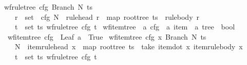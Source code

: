 \begin{isabellebody}
{\isacharbar}{\kern0pt}\ {\isachardoublequoteopen}wf{\isacharunderscore}{\kern0pt}rule{\isacharunderscore}{\kern0pt}tree\ cfg\ {\isacharparenleft}{\kern0pt}Branch\ N\ ts{\isacharparenright}{\kern0pt}\ {\isasymlongleftrightarrow}\ {\isacharparenleft}{\kern0pt}\isanewline
\ \ \ \ {\isacharparenleft}{\kern0pt}{\isasymexists}r\ {\isasymin}\ set\ {\isacharparenleft}{\kern0pt}{\isasymRR}\ cfg{\isacharparenright}{\kern0pt}{\isachardot}{\kern0pt}\ N\ {\isacharequal}{\kern0pt}\ rule{\isacharunderscore}{\kern0pt}head\ r\ {\isasymand}\ map\ root{\isacharunderscore}{\kern0pt}tree\ ts\ {\isacharequal}{\kern0pt}\ rule{\isacharunderscore}{\kern0pt}body\ r{\isacharparenright}{\kern0pt}\ {\isasymand}\isanewline
\ \ \ \ {\isacharparenleft}{\kern0pt}{\isasymforall}t\ {\isasymin}\ set\ ts{\isachardot}{\kern0pt}\ wf{\isacharunderscore}{\kern0pt}rule{\isacharunderscore}{\kern0pt}tree\ cfg\ t{\isacharparenright}{\kern0pt}{\isacharparenright}{\kern0pt}{\isachardoublequoteclose}\isanewline
\isanewline
{}\isamarkupfalse%
\ wf{\isacharunderscore}{\kern0pt}item{\isacharunderscore}{\kern0pt}tree\ {\isacharcolon}{\kern0pt}{\isacharcolon}{\kern0pt}\ {\isachardoublequoteopen}{\isacharprime}{\kern0pt}a\ cfg\ {\isasymRightarrow}\ {\isacharprime}{\kern0pt}a\ item\ {\isasymRightarrow}\ {\isacharprime}{\kern0pt}a\ tree\ {\isasymRightarrow}\ bool{\isachardoublequoteclose}\ \isanewline
\ \ {\isachardoublequoteopen}wf{\isacharunderscore}{\kern0pt}item{\isacharunderscore}{\kern0pt}tree\ cfg\ {\isacharunderscore}{\kern0pt}\ {\isacharparenleft}{\kern0pt}Leaf\ a{\isacharparenright}{\kern0pt}\ {\isasymlongleftrightarrow}\ True{\isachardoublequoteclose}\isanewline
{\isacharbar}{\kern0pt}\ {\isachardoublequoteopen}wf{\isacharunderscore}{\kern0pt}item{\isacharunderscore}{\kern0pt}tree\ cfg\ x\ {\isacharparenleft}{\kern0pt}Branch\ N\ ts{\isacharparenright}{\kern0pt}\ {\isasymlongleftrightarrow}\ {\isacharparenleft}{\kern0pt}\isanewline
\ \ \ \ N\ {\isacharequal}{\kern0pt}\ item{\isacharunderscore}{\kern0pt}rule{\isacharunderscore}{\kern0pt}head\ x\ {\isasymand}\ map\ root{\isacharunderscore}{\kern0pt}tree\ ts\ {\isacharequal}{\kern0pt}\ take\ {\isacharparenleft}{\kern0pt}item{\isacharunderscore}{\kern0pt}dot\ x{\isacharparenright}{\kern0pt}\ {\isacharparenleft}{\kern0pt}item{\isacharunderscore}{\kern0pt}rule{\isacharunderscore}{\kern0pt}body\ x{\isacharparenright}{\kern0pt}\ {\isasymand}\isanewline
\ \ \ \ {\isacharparenleft}{\kern0pt}{\isasymforall}t\ {\isasymin}\ set\ ts{\isachardot}{\kern0pt}\ wf{\isacharunderscore}{\kern0pt}rule{\isacharunderscore}{\kern0pt}tree\ cfg\ t{\isacharparenright}{\kern0pt}{\isacharparenright}{\kern0pt}{\isachardoublequoteclose}\isanewline

\end{isabellebody}
